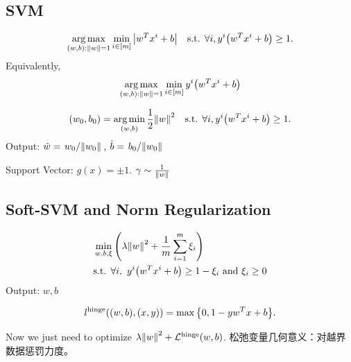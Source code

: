 \documentclass[a4paper,landscape]{article}
\begin{document}
\begin{tiny}
\begin{multicols}{4}

		\section{SVM}

		\[
			\mathop{\arg\max}_{(w,b):\norm{w}=1}\min_{i\in[m]}\qty|w^Tx^i+b|
			\ \ \
			\text{s.t. }\forall i, y^i\qty(w^Tx^i+b)\ge 1
			.\]
		Equivalently,
		\begin{equation}
			\mathop{\arg\max}_{(w,b):\norm{w}=1}\min_{i\in[m]}y^i\qty(w^Tx^i+b)
			\label{naive_svm}
		\end{equation}
		\begin{md}
			\[
				(w_0,b_0)=\mathop{\arg\min}_{(w,b)}\frac{1}{2}\norm{w}^2
				\ \ \
				\text{s.t. }\forall i, y^i\qty(w^Tx^i+b)\ge 1.
				\label{svm}
			\]
			Output: $\hat{w}=\flatfrac{w_0}{\norm{w_0}}$, $\hat{b}=\flatfrac{b_0}{\norm{w_0}}$
		\end{md}
		Support Vector: $g(x)=\pm 1$. $\gamma\sim \frac{1}{\norm{w}}$

		\subsection{Soft-SVM and Norm Regularization}
		\begin{md}
			\[
				\begin{aligned}
					 & \min_{w,b,\xi}\qty(\lambda\norm{w}^2+\frac{1}{m}\sum_{i=1}^m\xi_i)
					\\
					 & \text{s.t. }\forall i,\ y^i\qty(w^Tx^i+b)\ge 1-\xi_i \text{ and }
					\xi_i\ge 0
				\end{aligned}
			\]
			Output: $w,b$
		\end{md}
		\begin{defi}
			\[
				l^{\mathrm{hinge}}((w,b),(x,y))=\max\qty{0,1-yw^Tx+b}
				.\]
		\end{defi}
		Now we just need to optimize $\lambda\norm{w}^2+\mathcal{L}^{\mathrm{hinge}}(w,b)$.
		松弛变量几何意义：对越界数据惩罚力度。


\end{multicols}
\end{tiny}
\end{document}
